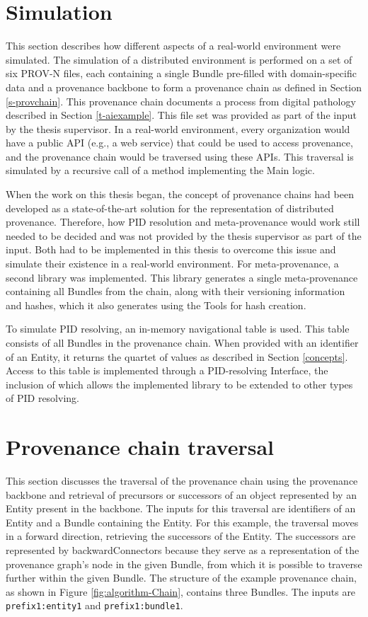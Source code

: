 \documentclass[
  digital,     %
  oneside,     %
  nosansbold,  %
  nocolorbold, %
  lof,         %
  lot,         %
]{fithesis4}
\begin{document}
\section{Simulation} \label{s-simulation}
\shorthandoff{-}
This section describes how different aspects of a real-world environment were simulated. The simulation of a distributed environment is performed on a set of six PROV-N files, each containing a single Bundle pre-filled with domain-specific data and a provenance backbone to form a provenance chain as defined in Section \ref{s-provchain}. This provenance chain documents a process from digital pathology described in Section \ref{t-aiexample}. This file set was provided as part of the input by the thesis supervisor. In a real-world environment, every organization would have a public API (e.g., a web service) that could be used to access provenance, and the provenance chain would be traversed using these APIs. This traversal is simulated by a recursive call of a method implementing the Main logic.

When the work on this thesis began, the concept of provenance chains had been developed as a state-of-the-art solution for the representation of distributed provenance. Therefore, how PID resolution and meta-provenance would work still needed to be decided and was not provided by the thesis supervisor as part of the input. Both had to be implemented in this thesis to overcome this issue and simulate their existence in a real-world environment. For meta-provenance, a second library was implemented. This library generates a single meta-provenance containing all Bundles from the chain, along with their versioning information and hashes, which it also generates using the Tools for hash creation. 

To simulate PID resolving, an in-memory navigational table is used. This table consists of all Bundles in the provenance chain. When provided with an identifier of an Entity, it returns the quartet of values as described in Section \ref{concepts}. Access to this table is implemented through a PID-resolving Interface, the inclusion of which allows the implemented library to be extended to other types of PID resolving.
\shorthandon{-}

\section{Provenance chain traversal}
\shorthandoff{-}
This section discusses the traversal of the provenance chain using the provenance backbone and retrieval of precursors or successors of an object represented by an Entity present in the backbone. The inputs for this traversal are identifiers of an Entity and a Bundle containing the Entity. For this example, the traversal moves in a forward direction, retrieving the successors of the Entity. The successors are represented by backwardConnectors because they serve as a representation of the provenance graph's node in the given Bundle, from which it is possible to traverse further within the given Bundle. The structure of the example provenance chain, as shown in Figure \ref{fig:algorithm-Chain}, contains three Bundles. The inputs are \texttt{prefix1:entity1} and \texttt{prefix1:bundle1}.
\end{document}
